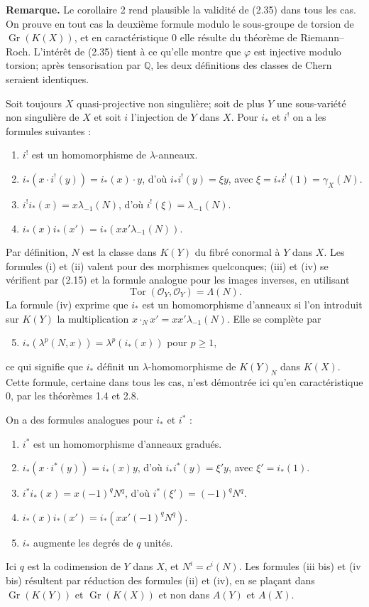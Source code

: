 \documentclass[11pt]{article}
\newcommand{\Gr}{\operatorname{Gr}}
\newcommand{\Tor}{\operatorname{Tor}}
\providecommand{\Q}{\mathbb Q}
\providecommand{\Gr}{\operatorname{Gr}}
\providecommand{\Tor}{\operatorname{Tor}}
\providecommand{\Gr}{\operatorname{G}}
\providecommand{\cO}{\mathcal O}
\begin{document}
\textbf{Remarque.} Le corollaire 2 rend plausible la validité de (2.35) dans tous les cas. On prouve en tout cas la deuxième formule modulo le sous-groupe de torsion de $\Gr(K(X))$, et en caractéristique $0$ elle résulte du théorème de Riemann--Roch. L'intérêt de (2.35) tient à ce qu'elle montre que $\varphi$ est injective modulo torsion; après tensorisation par $\Q$, les deux définitions des classes de Chern seraient identiques.

Soit toujours $X$ quasi-projective non singulière; soit de plus $Y$ une sous-variété non singulière de $X$ et soit $i$ l'injection de $Y$ dans $X$. Pour $i_*$ et $i^!$ on a les formules suivantes :
\begin{enumerate}[label=(\roman*)]
\item $i^!$ est un homomorphisme de $\lambda$-anneaux.
\item $i_*(x\cdot i^!(y))=i_*(x)\cdot y$, d'où $i_*i^!(y)=\xi y$, avec $\xi=i_*i^!(1)=\gamma_X(N)$.
\item $i^!i_*(x)=x\lambda_{-1}(N)$, d'où $i^!(\xi)=\lambda_{-1}(N)$.
\item $i_*(x)i_*(x')=i_*(xx'\lambda_{-1}(N))$.
\end{enumerate}
Par définition, $N$ est la classe dans $K(Y)$ du fibré conormal à $Y$ dans $X$. Les formules (i) et (ii) valent pour des morphismes quelconques; (iii) et (iv) se vérifient par (2.15) et la formule analogue pour les images inverses, en utilisant
\begin{equation}\tag{2.36}
 \Tor(\cO_Y,\cO_Y)=\Lambda(N).
\end{equation}
La formule (iv) exprime que $i_*$ est un homomorphisme d'anneaux si l'on introduit sur $K(Y)$ la multiplication $x\cdot_Nx'=xx'\lambda_{-1}(N)$. Elle se complète par
\begin{enumerate}[label=(\roman*)]
\setcounter{enumi}{4}
\item $i_*(\lambda^p(N,x))=\lambda^p(i_*(x))$ pour $p\geq1$,
\end{enumerate}
ce qui signifie que $i_*$ définit un $\lambda$-homomorphisme de $K(Y)_N$ dans $K(X)$. Cette formule, certaine dans tous les cas, n'est démontrée ici qu'en caractéristique $0$, par les théorèmes 1.4 et 2.8.

On a des formules analogues pour $i_*$ et $i^*$ :
\begin{enumerate}[label=(\roman* bis)]
\item $i^*$ est un homomorphisme d'anneaux gradués.
\item $i_*(x\cdot i^*(y))=i_*(x)y$, d'où $i_*i^*(y)=\xi'y$, avec $\xi'=i_*(1)$.
\item $i^*i_*(x)=x(-1)^qN^q$, d'où $i^*(\xi')=(-1)^qN^q$.
\item $i_*(x)i_*(x')=i_*(xx'(-1)^qN^q)$.
\item $i_*$ augmente les degrés de $q$ unités.
\end{enumerate}
Ici $q$ est la codimension de $Y$ dans $X$, et $N^i=c^i(N)$. Les formules (iii bis) et (iv bis) résultent par réduction des formules (ii) et (iv), en se plaçant dans $\Gr(K(Y))$ et $\Gr(K(X))$ et non dans $A(Y)$ et $A(X)$.
\end{document}
